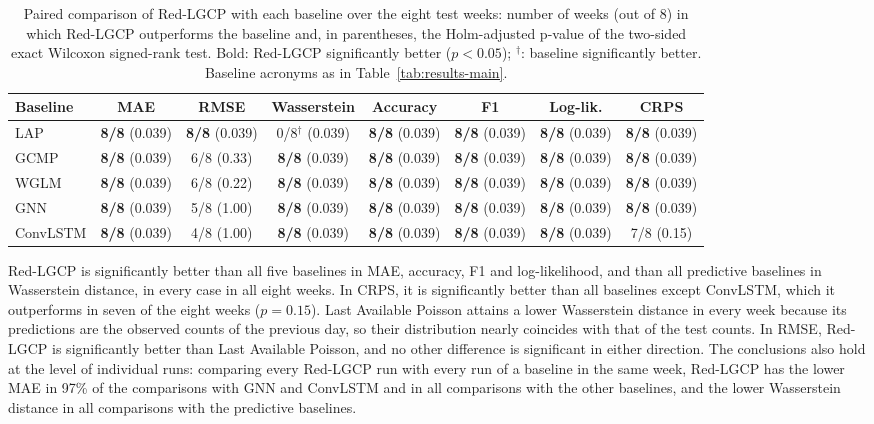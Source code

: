\begin{table}[t]
\centering
\caption{Paired comparison of Red-LGCP with each baseline over the eight test weeks: number of weeks (out of 8) in which Red-LGCP outperforms the baseline and, in parentheses, the Holm-adjusted p-value of the two-sided exact Wilcoxon signed-rank test. Bold: Red-LGCP significantly better ($p<0.05$); $^\dagger$: baseline significantly better. Baseline acronyms as in Table~\ref{tab:results-main}.}
\label{tab:significance}
\small
\setlength{\tabcolsep}{4pt}
\begin{tabular}{lccccccc}
\toprule
Baseline & MAE & RMSE & Wasserstein & Accuracy & F1 & Log-lik. & CRPS \\
\midrule
LAP & \textbf{8/8} (0.039) & \textbf{8/8} (0.039) & 0/8$^\dagger$ (0.039) & \textbf{8/8} (0.039) & \textbf{8/8} (0.039) & \textbf{8/8} (0.039) & \textbf{8/8} (0.039) \\
GCMP & \textbf{8/8} (0.039) & 6/8 (0.33) & \textbf{8/8} (0.039) & \textbf{8/8} (0.039) & \textbf{8/8} (0.039) & \textbf{8/8} (0.039) & \textbf{8/8} (0.039) \\
WGLM & \textbf{8/8} (0.039) & 6/8 (0.22) & \textbf{8/8} (0.039) & \textbf{8/8} (0.039) & \textbf{8/8} (0.039) & \textbf{8/8} (0.039) & \textbf{8/8} (0.039) \\
GNN & \textbf{8/8} (0.039) & 5/8 (1.00) & \textbf{8/8} (0.039) & \textbf{8/8} (0.039) & \textbf{8/8} (0.039) & \textbf{8/8} (0.039) & \textbf{8/8} (0.039) \\
ConvLSTM & \textbf{8/8} (0.039) & 4/8 (1.00) & \textbf{8/8} (0.039) & \textbf{8/8} (0.039) & \textbf{8/8} (0.039) & \textbf{8/8} (0.039) & 7/8 (0.15) \\
\bottomrule
\end{tabular}
\end{table}

Red-LGCP is significantly better than all five baselines in MAE, accuracy, F1 and log-likelihood, and than all predictive baselines in Wasserstein distance, in every case in all eight weeks. In CRPS, it is significantly better than all baselines except ConvLSTM, which it outperforms in seven of the eight weeks ($p=0.15$). Last Available Poisson attains a lower Wasserstein distance in every week because its predictions are the observed counts of the previous day, so their distribution nearly coincides with that of the test counts. In RMSE, Red-LGCP is significantly better than Last Available Poisson, and no other difference is significant in either direction. The conclusions also hold at the level of individual runs: comparing every Red-LGCP run with every run of a baseline in the same week, Red-LGCP has the lower MAE in 97\% of the comparisons with GNN and ConvLSTM and in all comparisons with the other baselines, and the lower Wasserstein distance in all comparisons with the predictive baselines.
